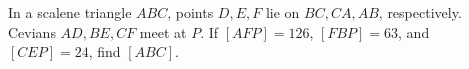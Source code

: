 In a scalene triangle $ABC$, points $D,E,F$ lie on $BC,CA,AB$, respectively. Cevians $AD,BE,CF$ meet at $P$. If $[AFP]=126$, $[FBP]=63$, and $[CEP]=24$, find $[ABC]$.
